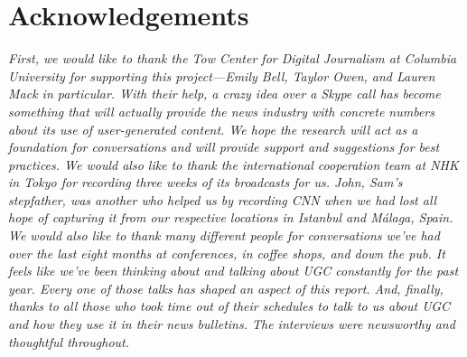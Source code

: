 \chapter{Acknowledgements}
\textit{First, we would like to thank the Tow Center for Digital Journalism at Columbia University for supporting this project—Emily Bell, Taylor Owen, and Lauren Mack in particular. With their help, a crazy idea over a Skype call has become something that will actually provide the news industry with concrete numbers about its use of user-generated content. We hope the research will act as a foundation for conversations and will provide support and suggestions for best practices. We would also like to thank the international cooperation team at NHK in Tokyo for recording three weeks of its broadcasts for us. John, Sam's stepfather, was another who helped us by recording CNN when we had lost all hope of capturing it from our respective locations in Istanbul and Málaga, Spain. We would also like to thank many different people for conversations we've had over the last eight months at conferences, in coffee shops, and down the pub. It feels like we've been thinking about and talking about UGC constantly for the past year. Every one of those talks has shaped an aspect of this report. And, finally, thanks to all those who took time out of their schedules to talk to us about UGC and how they use it in their news bulletins. The interviews were newsworthy and thoughtful throughout.}

